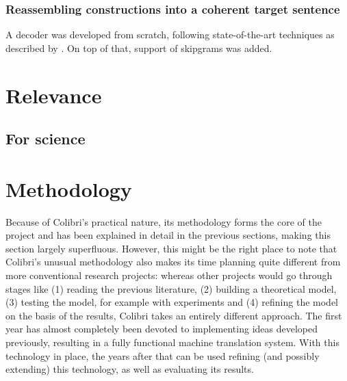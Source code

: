 \documentclass[12pt]{article}
\begin{document}
\subsubsection{Reassembling constructions into a coherent target sentence}
A decoder was developed from scratch, following state-of-the-art techniques as described by \citet{koehn03}. On top of that, support of skipgrams was added.










\section{Relevance}

\subsection{For science}





\section{Methodology}

Because of Colibri's practical nature, its methodology forms the core of the project and has been explained in detail in the previous sections, making this section largely superfluous. However, this might be the right place to note that Colibri's unusual methodology also makes its time planning quite different from more conventional research projects: whereas other projects would go through stages like (1) reading the previous literature, (2) building a theoretical model, (3) testing the model, for example with experiments and (4) refining the model on the basis of the results, Colibri takes an entirely different approach. The first year has almost completely been devoted to implementing ideas developed previously, resulting in a fully functional machine translation system. With this technology in place, the years after that can be used refining (and possibly extending) this technology, as well as evaluating its results.
\end{document}
